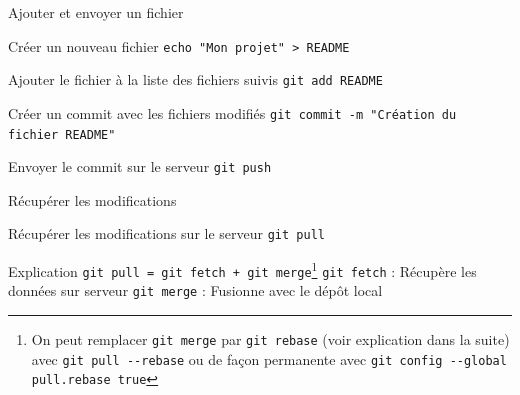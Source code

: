 \documentclass{beamer}
\begin{document}
\begin{frame}[fragile]{Ajouter et envoyer un fichier}
  \begin{block}{Créer un nouveau fichier}
    \textcolor{commandcolor}{\verb?echo "Mon projet" > README?}
  \end{block}

  \begin{block}{Ajouter le fichier à la liste des fichiers suivis}
    \textcolor{commandcolor}{\verb?git add README?}
  \end{block}

  \begin{block}{Créer un commit avec les fichiers modifiés}
    \textcolor{commandcolor}{\verb?git commit -m "Création du fichier README"?}
  \end{block}

  \begin{block}{Envoyer le commit sur le serveur}
    \textcolor{commandcolor}{\verb?git push?}
  \end{block}
\end{frame}

\begin{frame}[fragile]{Récupérer les modifications}
  \begin{block}{Récupérer les modifications sur le serveur}
    \textcolor{commandcolor}{\verb?git pull?}
  \end{block}
  \begin{block}{Explication}
    \textcolor{commandcolor}{\verb?git pull = git fetch + git merge?}\footnote{On peut remplacer \textcolor{commandcolor}{\verb?git merge?} par \textcolor{commandcolor}{\verb?git rebase?} (voir explication dans la suite) avec \textcolor{commandcolor}{\verb?git pull --rebase?}  ou de façon permanente avec \textcolor{commandcolor}{\verb?git config --global pull.rebase true?}}\linebreak
    \textcolor{commandcolor}{\verb?git fetch?} : Récupère les données sur serveur\linebreak
    \textcolor{commandcolor}{\verb?git merge?} : Fusionne avec le dép\^ot local    
  \end{block}
\end{frame}
\end{document}
